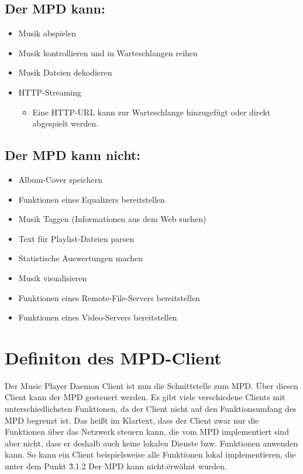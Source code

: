 \subsection{Der MPD kann:}
\renewcommand{\labelitemi}{•}
\begin{itemize}
    \item Musik abspielen
    \item Musik kontrollieren und in Warteschlangen reihen 
    \item Musik Dateien dekodieren
    \item HTTP-Streaming
        \renewcommand{\labelitemi}{--}
        \begin{itemize}
            \item Eine HTTP-URL kann zur Warteschlange hinzugefügt oder direkt abgespielt werden.\\
        \end{itemize}
\end{itemize}

\subsection{Der MPD kann nicht:}
\begin{itemize}
    \item Album-Cover speichern
    \item Funktionen eines Equalizers bereitstellen
    \item Musik Taggen (Informationen aus dem Web suchen)
    \item Text für Playlist-Dateien parsen
    \item Statistische Auswertungen machen
    \item Musik visualisieren
    \item Funktionen eines Remote-File-Servers bereitstellen
    \item Funktionen eines Video-Servers bereitstellen
\end{itemize}
\section{Definiton des MPD-Client}
Der Music Player Daemon Client ist nun die Schnittstelle zum MPD. Über diesen Client kann der MPD
gesteuert werden. Es gibt viele verschiedene Clients mit unterschiedlichsten Funktionen, da der 
Client nicht auf den Funktionsumfang des MPD begrenzt ist. Das heißt im Klartext, dass der Client
zwar nur die Funktionen über das Netzwerk steuern kann, die vom MPD implementiert sind aber nicht, 
dass er deshalb auch keine lokalen Dienste bzw. Funktionen anwenden kann. So kann ein Client 
beispielsweise alle Funktionen lokal implementieren, die unter dem Punkt \"3.1.2 Der MPD kann nicht:\" 
erwähnt wurden.

